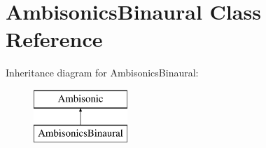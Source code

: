 \hypertarget{class_ambisonics_binaural}{\section{Ambisonics\-Binaural Class Reference}
\label{class_ambisonics_binaural}
}
Inheritance diagram for Ambisonics\-Binaural\-:\begin{figure}[H]
\begin{center}
\leavevmode
\includegraphics[height=2.000000cm]{class_ambisonics_binaural}
\end{center}
\end{figure}
